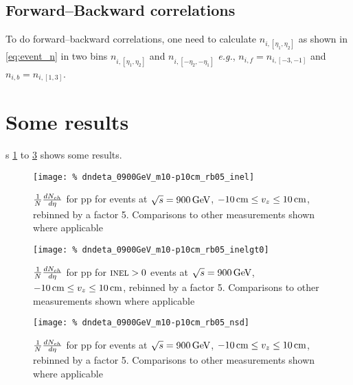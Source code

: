 \documentclass[11pt]{article}
\def\AlwaysText#1{\ifmmode\relax\text{#1}\else #1\fi}
\newcommand{\AbbrName}[1]{\AlwaysText{{\scshape #1}}}
\newcommand{\INEL}{\AbbrName{inel}}
\newcommand{\INELONE}{$\AbbrName{inel}>0$}
\newcommand{\NSD}{\AbbrName{nsd}}
\newcommand{\dndeta}[1][]{{\ensuremath%
    \ifx|#1|\else\left.\fi%
    \frac{1}{N}\frac{dN_{ch}}{d\eta}%
    \ifx|#1|\else\right|_{#1}\fi%
}}
\newcommand{\GeV}[1]{\unit[#1]{\AlwaysText{GeV}}}
\newcommand{\cm}[1]{\unit[#1]{\AlwaysText{cm}}}
\begin{document}
\subsection{Forward--Backward correlations} 

To do forward--backward correlations, one need to calculate
$n_{i,[\eta_1,\eta_2]}$ as shown in \eqref{eq:event_n} in two bins
$n_{i,[\eta_1,\eta_2]}$ and $n_{i,[-\eta_2,-\eta_1]}$ \textit{e.g.},
$n_{i,f}=n_{i,[-3,-1]}$ and $n_{i,b}=n_{i,[1,3]}$. 

\section{Some results}

\figurename{}s \ref{fig:1} to \ref{fig:3} shows some results.

\begin{figure}[tbp]
  \centering
  \texttt{[image: \%
    dndeta\_0900GeV\_m10-p10cm\_rb05\_inel]}
  \caption{$\dndeta$ for pp for \INEL{} events at $\sqrt{s}=\GeV{900}$,
    $\cm{-10}\le v_z\le\cm{10}$, rebinned by a factor 5.  Comparisons
    to other measurements shown where applicable}
  \label{fig:1}
\end{figure} 
\begin{figure}[tbp]
  \centering
  \texttt{[image: \%
    dndeta\_0900GeV\_m10-p10cm\_rb05\_inelgt0]}
  \caption{$\dndeta$ for pp for \INELONE{} events at
    $\sqrt{s}=\GeV{900}$, $\cm{-10}\le v_z\le\cm{10}$, rebinned by a
    factor 5.  Comparisons to other measurements shown where
    applicable}
  \label{fig:2}
\end{figure} 
\begin{figure}[tbp]
  \centering
  \texttt{[image: \%
    dndeta\_0900GeV\_m10-p10cm\_rb05\_nsd]}
  \caption{$\dndeta$ for pp for \NSD{} events at $\sqrt{s}=\GeV{900}$,
    $\cm{-10}\le v_z\le\cm{10}$, rebinned by a factor 5.  Comparisons
    to other measurements shown where applicable}
  \label{fig:3}
\end{figure} 

\clearpage
\appendix 
\end{document}
